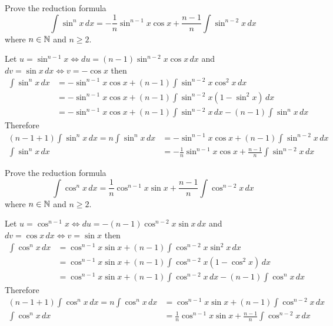 \begin{problem}
    Prove the reduction formula
    \[\int\sin^n x\,dx
    =-\frac{1}{n}\sin^{n-1}x\cos x+\frac{n-1}{n}\int\sin^{n-2}x\,dx\]
    where \(n\in\mathbb{N}\) and \(n\geq 2\).
\end{problem}
\begin{solution}
    Let \(u=\sin^{n-1}x\iff du=(n-1)\sin^{n-2}x\cos x\,dx\) and
    \(dv=\sin x\,dx\iff v=-\cos x\) then
    \begin{align*}
        \int\sin^n x\,dx
        &= -\sin^{n-1}x\cos x+(n-1)\int \sin^{n-2}x\cos^2 x\,dx \\
        &= -\sin^{n-1}x\cos x+(n-1)\int \sin^{n-2}x(1-\sin^2 x)\,dx \\
        &= -\sin^{n-1}x\cos x+(n-1)\int \sin^{n-2}x\,dx-(n-1)\int\sin^n x\,dx
    \end{align*}
    Therefore
    \begin{align*}
        (n-1+1)\int\sin^n x\,dx=n\int\sin^n x\,dx
        &= -\sin^{n-1}x\cos x+(n-1)\int \sin^{n-2}x\,dx \\
        \int\sin^n x\,dx
        &= -\frac{1}{n}\sin^{n-1}x\cos x
        +\frac{n-1}{n}\int\sin^{n-2}x\,dx 
    \end{align*}
\end{solution}
\begin{problem}
    Prove the reduction formula
    \[\int\cos^n x\,dx
    =\frac{1}{n}\cos^{n-1}x\sin x+\frac{n-1}{n}\int\cos^{n-2}x\,dx\]
    where \(n\in\mathbb{N}\) and \(n\geq 2\).
\end{problem}
\begin{solution}
    Let \(u=\cos^{n-1}x\iff du=-(n-1)\cos^{n-2}x\sin x\,dx\) and
    \(dv=\cos x\,dx\iff v=\sin x\) then
    \begin{align*}
        \int\cos^n x\,dx
        &= \cos^{n-1} x\sin x+(n-1)\int\cos^{n-2}x\sin^2 x\,dx \\
        &= \cos^{n-1} x\sin x+(n-1)\int \cos^{n-2}x(1-\cos^2 x)\,dx \\
        &= \cos^{n-1} x\sin x+(n-1)\int \cos^{n-2}x\,dx-(n-1)\int\cos^n x\,dx
    \end{align*}
    Therefore
    \begin{align*}
        (n-1+1)\int\cos^n x\,dx=n\int\cos^n x\,dx
        &= \cos^{n-1}x\sin x+(n-1)\int \cos^{n-2}x\,dx \\
        \int\cos^n x\,dx
        &= \frac{1}{n}\cos^{n-1}x\sin x
        +\frac{n-1}{n}\int\cos^{n-2}x\,dx 
    \end{align*}
\end{solution}
